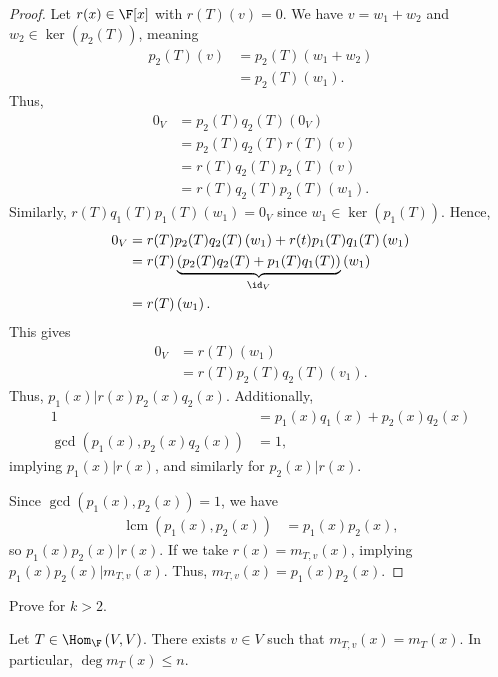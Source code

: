 \documentclass[10pt]{mypackage}
\DeclareMathOperator*{\lcm}{lcm}
\begin{document}
\begin{proof}
Let $r(x)\in \F[x]$ with $r(T)(v) = 0$. We have $v = w_1 + w_2$ and $w_2\in \ker\left( p_2(T)\right)$, meaning
\begin{align*}
  p_2(T)(v) &= p_2(T)\left(w_1 + w_2\right)\\
            &= p_2(T)\left(w_1\right).
\end{align*}
Thus,
\begin{align*}
  0_V &= p_2(T)q_2(T)\left(0_V\right)\\
      &= p_2(T)q_2(T)r(T)(v)\\
      &= r(T)q_2(T)p_2(T)(v)\\
      &= r(T)q_2(T)p_2(T)\left(w_1\right).
\end{align*}
Similarly, $r(T)q_1(T)p_1(T)\left(w_1\right) = 0_V$ since $w_1\in \ker\left(p_1(T)\right)$. Hence,
\begin{align*}
  0_V &= r(T)p_2(T)q_2(T)\left(w_1\right) + r(t)p_1(T)q_1(T)\left(w_1\right)\\
      &= r(T)\underbrace{\left(p_2(T)q_2(T) + p_1(T)q_1(T)\right)}_{\id_V}\left(w_1\right)\\
      &= r(T)\left(w_1\right).
\end{align*}
This gives
\begin{align*}
  0_V &= r(T)\left(w_1\right)\\
      &= r(T)p_2(T)q_2(T)\left(v_1\right).
\end{align*}
Thus, $p_1(x)|r(x)p_2(x)q_2(x)$. Additionally,
\begin{align*}
  1 &= p_1(x)q_1(x) + p_2(x)q_2(x)\\
  \gcd\left(p_1(x),p_2(x)q_2(x)\right) &= 1,
\end{align*}
implying $p_1(x)|r(x)$, and similarly for $p_2(x) | r(x)$.\newline

Since $\gcd\left(p_1(x),p_2(x)\right) = 1$, we have
\begin{align*}
  \lcm\left(p_1(x),p_2(x)\right) &= p_1(x)p_2(x),
\end{align*}
so $p_1(x)p_2(x) | r(x)$. If we take $r(x) = m_{T,v}(x)$, implying $p_1(x)p_2(x)|m_{T,v}(x)$. Thus, $m_{T,v}(x) = p_1(x)p_2(x)$.
\end{proof}
\begin{exercise}
  Prove for $k > 2$.
\end{exercise}
\begin{theorem}
  Let $T\in \Hom_{\F}\left(V,V\right)$. There exists $v\in V$ such that $m_{T,v}\left(x\right) = m_{T}(x)$. In particular, $\deg m_{T}(x) \leq n$.
\end{theorem}
\end{document}
